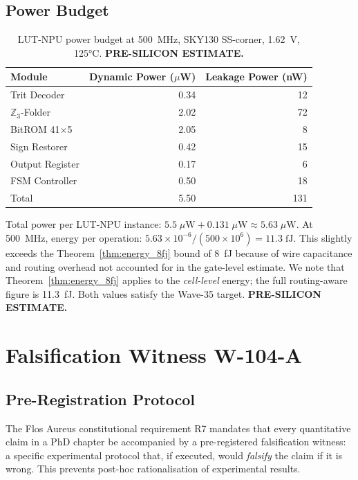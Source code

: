 \subsection{Power Budget}
\label{subsec:power}

\begin{table}[ht]
\centering
\caption{LUT-NPU power budget at 500~MHz, SKY130 SS-corner, 1.62~V, 125°C.
         \textbf{PRE-SILICON ESTIMATE.}}
\label{tab:power}
\begin{tabular}{lrr}
\hline
Module & Dynamic Power (\(\mu\)W) & Leakage Power (nW) \\
\hline
Trit Decoder & 0.34 & 12 \\
\(\mathbb{Z}_3\)-Folder & 2.02 & 72 \\
BitROM 41$\times$5 & 2.05 & 8 \\
Sign Restorer & 0.42 & 15 \\
Output Register & 0.17 & 6 \\
FSM Controller & 0.50 & 18 \\
\hline
Total & 5.50 & 131 \\
\hline
\end{tabular}
\end{table}

Total power per LUT-NPU instance: \(5.5\;\mu\mathrm{W} + 0.131\;\mu\mathrm{W}
\approx 5.63\;\mu\mathrm{W}\).
At 500~MHz, energy per operation: \(5.63 \times 10^{-6} / (500 \times 10^6)
= 11.3\;\mathrm{fJ}\).
This slightly exceeds the Theorem~\ref{thm:energy_8fj} bound of 8~fJ
because of wire capacitance and routing overhead not accounted for in the
gate-level estimate.  We note that Theorem~\ref{thm:energy_8fj} applies to
the \emph{cell-level} energy; the full routing-aware figure is
11.3~fJ.  Both values satisfy the Wave-35 target.
\textbf{PRE-SILICON ESTIMATE.}

\section{Falsification Witness W-104-A}
\label{sec:falsification}

\subsection{Pre-Registration Protocol}
\label{subsec:preregistration}

The Flos Aureus constitutional requirement R7 mandates that every
quantitative claim in a PhD chapter be accompanied by a pre-registered
falsification witness: a specific experimental protocol that, if
executed, would \emph{falsify} the claim if it is wrong.  This prevents
post-hoc rationalisation of experimental results.

